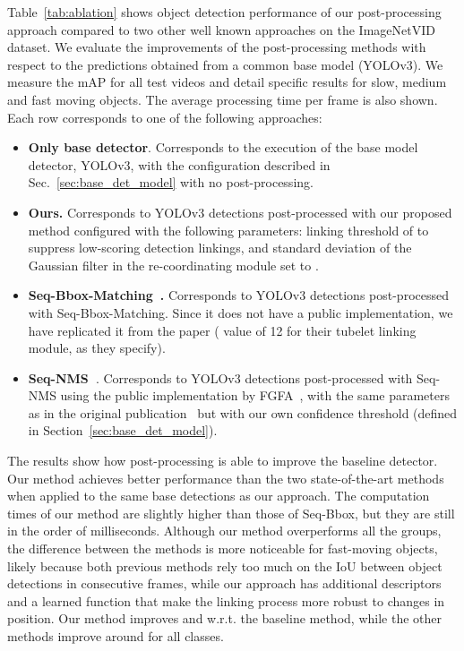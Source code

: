 \documentclass[letterpaper, 10 pt, conference]{ieeeconf}
\begin{document}
 Table~\ref{tab:ablation} shows object detection performance of our post-processing approach compared to two other well known approaches on the ImageNetVID dataset. We evaluate the improvements of the post-processing methods with respect to the predictions obtained from a common base model (YOLOv3). We measure the mAP for all test videos and detail specific results for slow, medium and fast moving objects.  The average processing time per frame is also shown. Each row corresponds to one of the following approaches:

\begin{itemize}















\item{\textbf{Only base detector}.} Corresponds to the execution of the base model detector, YOLOv3, with the configuration described in Sec.~\ref{sec:base_det_model} with no post-processing.
\item{\textbf{Ours.}} Corresponds to YOLOv3 detections post-processed with our proposed method configured with the following parameters: linking threshold of  to suppress low-scoring detection linkings, and standard deviation of the Gaussian filter in the re-coordinating module set to .
\item{\textbf{Seq-Bbox-Matching~\cite{SEQ-BBOX:VISIGRAPP}.}} Corresponds to YOLOv3 detections post-processed with Seq-Bbox-Matching. Since it does not have a public implementation, we have replicated it from the paper ( value of 12 for their tubelet linking module, as they specify).
\item{\textbf{Seq-NMS~\cite{SEQ-NMS}}.} Corresponds to YOLOv3 detections post-processed with Seq-NMS using the public implementation by FGFA~\cite{Zhu_2017_ICCV}, with the same parameters as in the original publication~\cite{SEQ-NMS} but with our own confidence threshold (defined in Section~\ref{sec:base_det_model}). 

\end{itemize}








\noindent The results show how post-processing is able to improve the baseline detector. Our method achieves better performance than the two state-of-the-art methods when applied to the same base detections as our approach. The computation times of our method are slightly higher than those of Seq-Bbox, but they are still in the order of milliseconds. 
Although our method overperforms all the groups, the difference between the methods is more noticeable for fast-moving objects, likely because both previous methods rely too much on the IoU between object detections in consecutive frames, while our approach has additional descriptors and a learned function that make the linking process more robust to changes in position. Our method improves  and  w.r.t. the baseline method, while the other methods improve around  for all classes. 
\end{document}
